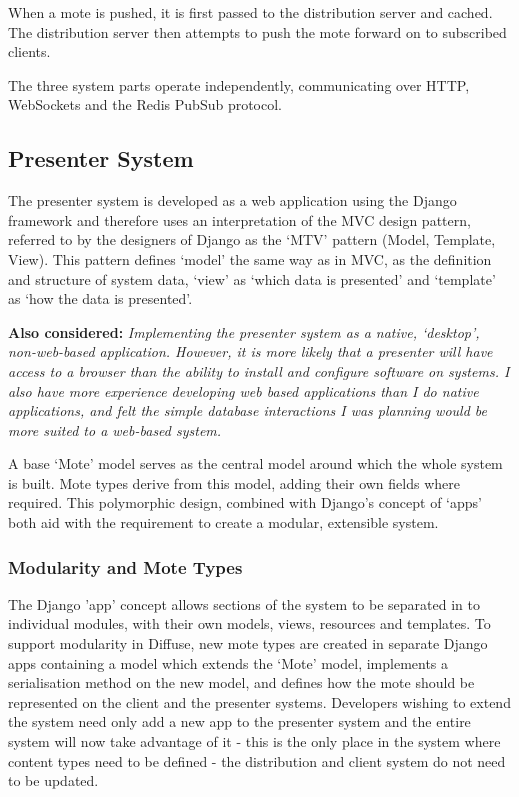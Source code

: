\documentclass[a4papert,11pt,notitlepage]{ltxdoc}
\begin{document}
When a mote is pushed, it is first passed to the distribution server and cached. The distribution server then attempts to push the mote forward on to subscribed clients.

The three system parts operate independently, communicating over HTTP, WebSockets and the Redis PubSub protocol.


\subsection{Presenter System}
The presenter system is developed as a web application using the Django framework and therefore uses an interpretation of the MVC design pattern, referred to by the designers of Django as the `MTV' pattern (Model, Template, View). This pattern defines `model' the same way as in MVC, as the definition and structure of system data, `view' as `which data is presented' and `template' as `how the data is presented'\cite{djangomvcfaq:web}.

\textbf{Also considered:} \emph{Implementing the presenter system as a native, `desktop', non-web-based application. However, it is more likely that a presenter will have access to a browser than the ability to install and configure software on systems. I also have more experience developing web based applications than I do native applications, and felt the simple database interactions I was planning would be more suited to a web-based system.}

A base `Mote' model serves as the central model around which the whole system is built. Mote types derive from this model, adding their own fields where required. This polymorphic design, combined with Django's concept of `apps' both aid with the requirement to create a modular, extensible system.

\subsubsection{Modularity and Mote Types}
The Django 'app' concept allows sections of the system to be separated in to individual modules, with their own models, views, resources and templates. To support modularity in Diffuse, new mote types are created in separate Django apps containing a model which extends the `Mote' model, implements a serialisation method on the new model, and defines how the mote should be represented on the client and the presenter systems. Developers wishing to extend the system need only add a new app to the presenter system and the entire system will now take advantage of it - this is the only place in the system where content types need to be defined - the distribution and client system do not need to be updated. 
\end{document}
